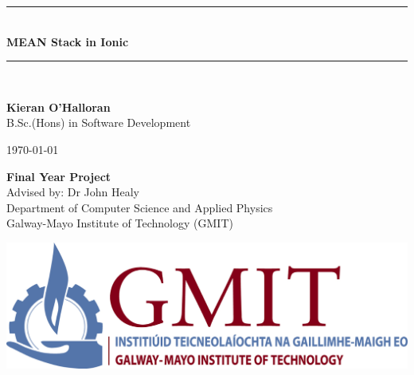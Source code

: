 \documentclass[12pt,a4paper,oneside,openany]{book}
\newcommand{\projecttitle}{MEAN Stack in Ionic}
\newcommand{\projectauthor}{Kieran O'Halloran}
\newcommand{\projectadvisor}{Dr John Healy}
\newcommand{\projectprogramme}{B.Sc.(Hons) in Software Development}
\newcommand{\projectdate}{\today}
\begin{document}
  \begin{titlepage}
    \begin{minipage}[t][6cm]{\textwidth}
      \centering
      \rule{\linewidth}{0.5mm} \\[0.4cm]
      { \LARGE \bfseries \projecttitle \\[0.4cm] }
      \rule{\linewidth}{0.5mm} \\[0.8cm]
    \end{minipage}
    
    \begin{minipage}[t][6.5cm]{\textwidth}
      \centering
      \textbf{\projectauthor}\\[0.5cm]
      \projectprogramme
    \end{minipage}
  
    \begin{minipage}[t][1cm]{\textwidth}
      \centering
      \textsc{\projectdate}
    \end{minipage}
      
    \begin{minipage}[t][3cm]{\textwidth}
      \centering
      \textbf{Final Year Project}\\[0.3cm]
      Advised by: \projectadvisor \\[0.1cm]
      Department of Computer Science and Applied Physics\\
      Galway-Mayo Institute of Technology (GMIT)
    \end{minipage}
  
    \begin{center}    
      \includegraphics{img/gmit-logo.jpg}
    \end{center}
  \end{titlepage}
  \setcounter{page}{2}
  \tableofcontents
  
  
  
\end{document}
